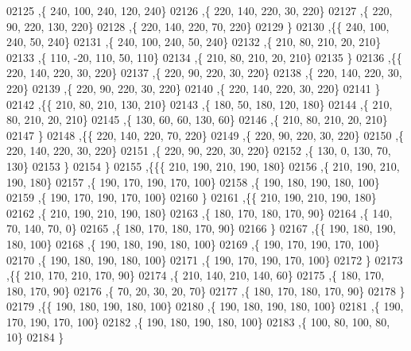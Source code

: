 \begin{DoxyCode}
02125     ,\{   240,   100,   240,   120,   240\}
02126     ,\{   220,   140,   220,    30,   220\}
02127     ,\{   220,    90,   220,   130,   220\}
02128     ,\{   220,   140,   220,    70,   220\}
02129     \}
02130    ,\{\{   240,   100,   240,    50,   240\}
02131     ,\{   240,   100,   240,    50,   240\}
02132     ,\{   210,    80,   210,    20,   210\}
02133     ,\{   110,   -20,   110,    50,   110\}
02134     ,\{   210,    80,   210,    20,   210\}
02135     \}
02136    ,\{\{   220,   140,   220,    30,   220\}
02137     ,\{   220,    90,   220,    30,   220\}
02138     ,\{   220,   140,   220,    30,   220\}
02139     ,\{   220,    90,   220,    30,   220\}
02140     ,\{   220,   140,   220,    30,   220\}
02141     \}
02142    ,\{\{   210,    80,   210,   130,   210\}
02143     ,\{   180,    50,   180,   120,   180\}
02144     ,\{   210,    80,   210,    20,   210\}
02145     ,\{   130,    60,    60,   130,    60\}
02146     ,\{   210,    80,   210,    20,   210\}
02147     \}
02148    ,\{\{   220,   140,   220,    70,   220\}
02149     ,\{   220,    90,   220,    30,   220\}
02150     ,\{   220,   140,   220,    30,   220\}
02151     ,\{   220,    90,   220,    30,   220\}
02152     ,\{   130,     0,   130,    70,   130\}
02153     \}
02154    \}
02155   ,\{\{\{   210,   190,   210,   190,   180\}
02156     ,\{   210,   190,   210,   190,   180\}
02157     ,\{   190,   170,   190,   170,   100\}
02158     ,\{   190,   180,   190,   180,   100\}
02159     ,\{   190,   170,   190,   170,   100\}
02160     \}
02161    ,\{\{   210,   190,   210,   190,   180\}
02162     ,\{   210,   190,   210,   190,   180\}
02163     ,\{   180,   170,   180,   170,    90\}
02164     ,\{   140,    70,   140,    70,     0\}
02165     ,\{   180,   170,   180,   170,    90\}
02166     \}
02167    ,\{\{   190,   180,   190,   180,   100\}
02168     ,\{   190,   180,   190,   180,   100\}
02169     ,\{   190,   170,   190,   170,   100\}
02170     ,\{   190,   180,   190,   180,   100\}
02171     ,\{   190,   170,   190,   170,   100\}
02172     \}
02173    ,\{\{   210,   170,   210,   170,    90\}
02174     ,\{   210,   140,   210,   140,    60\}
02175     ,\{   180,   170,   180,   170,    90\}
02176     ,\{    70,    20,    30,    20,    70\}
02177     ,\{   180,   170,   180,   170,    90\}
02178     \}
02179    ,\{\{   190,   180,   190,   180,   100\}
02180     ,\{   190,   180,   190,   180,   100\}
02181     ,\{   190,   170,   190,   170,   100\}
02182     ,\{   190,   180,   190,   180,   100\}
02183     ,\{   100,    80,   100,    80,    10\}
02184     \}

\end{DoxyCode}
